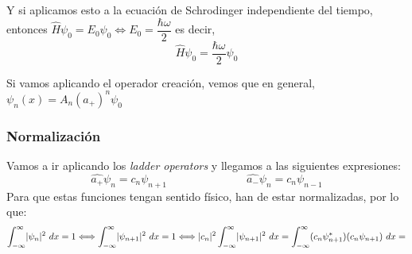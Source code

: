 \documentclass{report}
\begin{document}
    \noindent Y si aplicamos esto a la ecuación de Schrodinger independiente del tiempo, entonces
    $\hat{H}\psi_0=E_0\psi_0\Longleftrightarrow E_0=\dfrac{\hbar\omega}{2}$ es decir,
    \[\hat{H}\psi_0=\dfrac{\hbar\omega}{2}\psi_0\]

    \noindent Si vamos aplicando el operador creación, vemos que en general, $\psi_n(x)=A_n(a_+)^n\psi_0$
    \subsubsection{Normalización}
      \noindent Vamos a ir aplicando los \textit{ladder operators} y llegamos a las siguientes expresiones:
      \[\hat{a_+}\psi_n=c_n\psi_{n+1}\hspace{3cm}\hat{a_-}\psi_n=c_n\psi_{n-1}\]
      Para que estas funciones tengan sentido físico, han de estar normalizadas, por lo que:
      \[\int_{-\infty}^\infty \abs{\psi_n}^2\ dx=1\Longleftrightarrow\int_{-\infty}^\infty \abs{\psi_{n+1}}^2\ dx=1
      \Longleftrightarrow \abs{c_n}^2\int_{-\infty}^\infty \abs{\psi_{n+1}}^2\ dx
      = \int_{-\infty}^\infty (c_n\psi_{n+1}^*)(c_n\psi_{n+1})\ dx=\]
      
\end{document}
